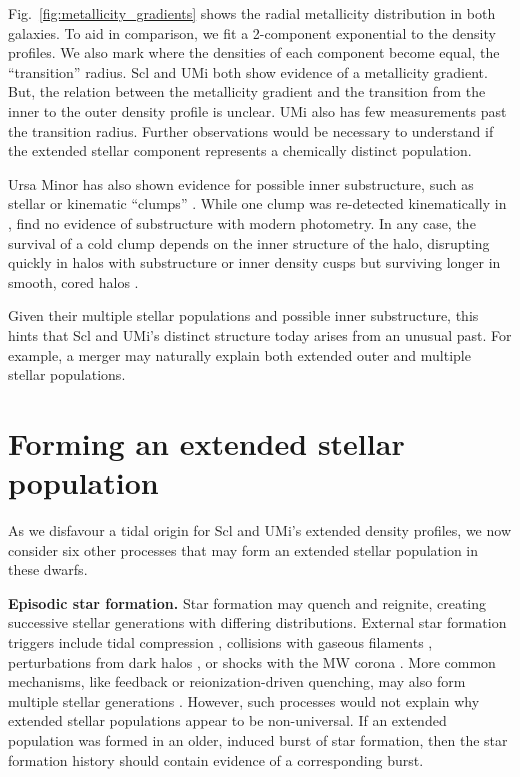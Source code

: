 Fig.~\ref{fig:metallicity_gradients} shows the radial metallicity
distribution in both galaxies. To aid in comparison, we fit a
2-component exponential to the density profiles. We also mark where the
densities of each component become equal, the ``transition'' radius. Scl
and UMi both show evidence of a metallicity gradient. But, the relation
between the metallicity gradient and the transition from the inner to
the outer density profile is unclear. UMi also has few measurements past
the transition radius. Further observations would be necessary to
understand if the extended stellar component represents a chemically
distinct population.

Ursa Minor has also shown evidence for possible inner substructure, such
as stellar or kinematic ``clumps''
\citep[e.g.,][]{olszewski+aaronson1985, demers+1995, kleyna+1998, battinelli+demers1999, bellazzini+2002}.
While one clump was re-detected kinematically in \citet{pace+2014},
\citet{munoz+2018} find no evidence of substructure with modern
photometry. In any case, the survival of a cold clump depends on the
inner structure of the halo, disrupting quickly in halos with
substructure or inner density cusps but surviving longer in smooth,
cored halos \citep{kleyna+2003, lora+2012}.

Given their multiple stellar populations and possible inner
substructure, this hints that Scl and UMi's distinct structure today
arises from an unusual past. For example, a merger may naturally explain
both extended outer and multiple stellar populations.

\section{Forming an extended stellar
population}\label{sec:stellar_halos}

As we disfavour a tidal origin for Scl and UMi's extended density
profiles, we now consider six other processes that may form an extended
stellar population in these dwarfs.

\textbf{Episodic star formation.} Star formation may quench and
reignite, creating successive stellar generations with differing
distributions. External star formation triggers include tidal
compression \citep{mayer+2001a, dong+lin+murray2003}, collisions with
gaseous filaments \citep{genina+2019}, perturbations from dark halos
\citep{starkenburg+helmi+sales2016}, or shocks with the MW corona
\citep{wright+2019}. More common mechanisms, like feedback or
reionization-driven quenching, may also form multiple stellar
generations
\citep{kawata+2006, benitez-llambay+2015, revaz+jablonka2018}. However,
such processes would not explain why extended stellar populations appear
to be non-universal. If an extended population was formed in an older,
induced burst of star formation, then the star formation history should
contain evidence of a corresponding burst.

